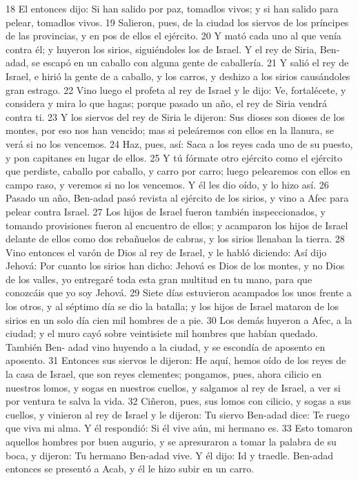 18 El entonces dijo: Si han salido por paz, tomadlos vivos; y si han salido para pelear, tomadlos vivos.
19 Salieron, pues, de la ciudad los siervos de los príncipes de las provincias, y en pos de ellos el ejército.
20 Y mató cada uno al que venía contra él; y huyeron los sirios, siguiéndoles los de Israel. Y el rey de Siria, Ben-adad, se escapó en un caballo con alguna gente de caballería.
21 Y salió el rey de Israel, e hirió la gente de a caballo, y los carros, y deshizo a los sirios causándoles gran estrago.
22 Vino luego el profeta al rey de Israel y le dijo: Ve, fortalécete, y considera y mira lo que hagas; porque pasado un año, el rey de Siria vendrá contra ti.
23 Y los siervos del rey de Siria le dijeron: Sus dioses son dioses de los montes, por eso nos han vencido; mas si peleáremos con ellos en la llanura, se verá si no los vencemos.
24 Haz, pues, así: Saca a los reyes cada uno de su puesto, y pon capitanes en lugar de ellos.
25 Y tú fórmate otro ejército como el ejército que perdiste, caballo por caballo, y carro por carro; luego pelearemos con ellos en campo raso, y veremos si no los vencemos. Y él les dio oído, y lo hizo así.
26 Pasado un año, Ben-adad pasó revista al ejército de los sirios, y vino a Afec para pelear contra Israel.
27 Los hijos de Israel fueron también inspeccionados, y tomando provisiones fueron al encuentro de ellos; y acamparon los hijos de Israel delante de ellos como dos rebañuelos de cabras, y los sirios llenaban la tierra.
28 Vino entonces el varón de Dios al rey de Israel, y le habló diciendo: Así dijo Jehová: Por cuanto los sirios han dicho: Jehová es Dios de los montes, y no Dios de los valles, yo entregaré toda esta gran multitud en tu mano, para que conozcáis que yo soy Jehová.
29 Siete días estuvieron acampados los unos frente a los otros, y al séptimo día se dio la batalla; y los hijos de Israel mataron de los sirios en un solo día cien mil hombres de a pie.
30 Los demás huyeron a Afec, a la ciudad; y el muro cayó sobre veintisiete mil hombres que habían quedado. También Ben- adad vino huyendo a la ciudad, y se escondía de aposento en aposento.
31 Entonces sus siervos le dijeron: He aquí, hemos oído de los reyes de la casa de Israel, que son reyes clementes; pongamos, pues, ahora cilicio en nuestros lomos, y sogas en nuestros cuellos, y salgamos al rey de Israel, a ver si por ventura te salva la vida.
32 Ciñeron, pues, sus lomos con cilicio, y sogas a sus cuellos, y vinieron al rey de Israel y le dijeron: Tu siervo Ben-adad dice: Te ruego que viva mi alma. Y él respondió: Si él vive aún, mi hermano es.
33 Esto tomaron aquellos hombres por buen augurio, y se apresuraron a tomar la palabra de su boca, y dijeron: Tu hermano Ben-adad vive. Y él dijo: Id y traedle. Ben-adad entonces se presentó a Acab, y él le hizo subir en un carro.
